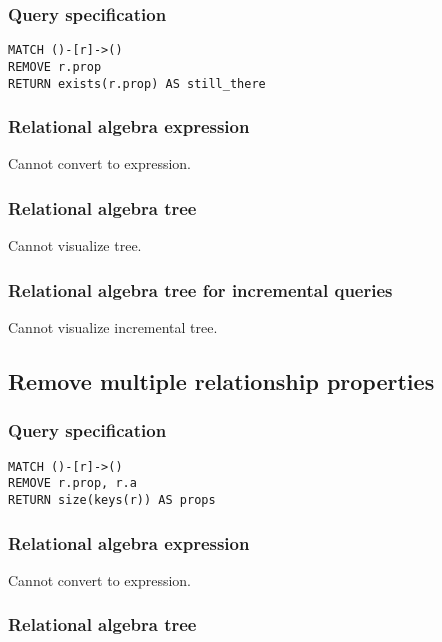 \subsubsection*{Query specification}

\begin{lstlisting}
MATCH ()-[r]->()
REMOVE r.prop
RETURN exists(r.prop) AS still_there
\end{lstlisting}

\subsubsection*{Relational algebra expression}

Cannot convert to expression.

\subsubsection*{Relational algebra tree}

Cannot visualize tree.

\subsubsection*{Relational algebra tree for incremental queries}

Cannot visualize incremental tree.

\subsection{Remove multiple relationship properties}

\subsubsection*{Query specification}

\begin{lstlisting}
MATCH ()-[r]->()
REMOVE r.prop, r.a
RETURN size(keys(r)) AS props
\end{lstlisting}

\subsubsection*{Relational algebra expression}

Cannot convert to expression.

\subsubsection*{Relational algebra tree}

